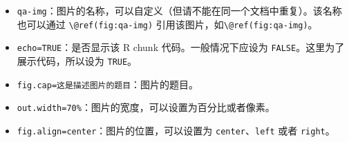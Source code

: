 \documentclass[]{ctexbook}
\providecommand{\tightlist}{%
  \setlength{\itemsep}{0pt}\setlength{\parskip}{0pt}}
\theoremstyle{definition}
\theoremstyle{definition}
\theoremstyle{definition}
\theoremstyle{definition}
\theoremstyle{remark}
\begin{document}
\begin{itemize}
\tightlist
\item
  \texttt{qa-img}：图片的名称，可以自定义（但请不能在同一个文档中重复）。该名称也可以通过 \texttt{\textbackslash{}@ref(fig:qa-img)} 引用该图片，如\texttt{\textbackslash{}@ref(fig:qa-img)}。
\item
  \texttt{echo=TRUE}：是否显示该 R chunk 代码。一般情况下应设为 \texttt{FALSE}。这里为了展示代码，所以设为 \texttt{TRUE}。
\item
  \texttt{fig.cap=\textquotesingle{}这是描述图片的题目\textquotesingle{}}：图片的题目。
\item
  \texttt{out.width=\textquotesingle{}70\%\textquotesingle{}}：图片的宽度，可以设置为百分比或者像素。
\item
  \texttt{fig.align=\textquotesingle{}center\textquotesingle{}}：图片的位置，可以设置为 \texttt{center}、\texttt{left} 或者 \texttt{right}。
\end{itemize}



\backmatter
\printindex
\end{document}
